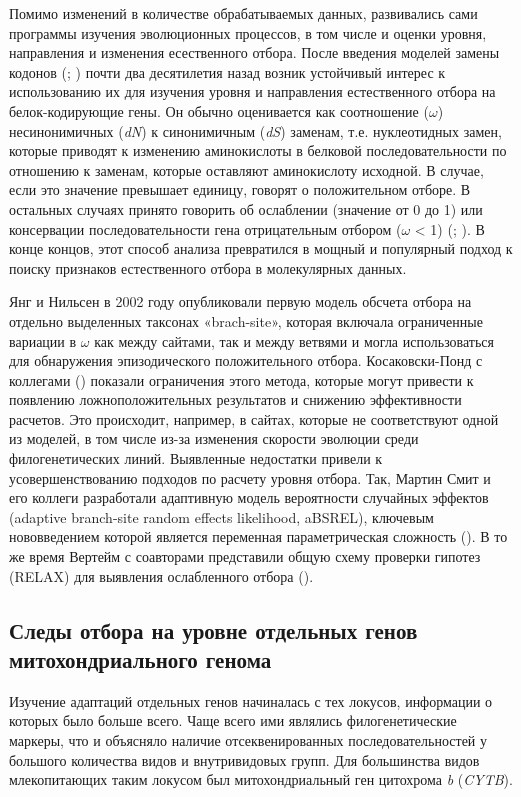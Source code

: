 Помимо изменений в количестве обрабатываемых данных, развивались сами программы изучения эволюционных процессов, в том числе и оценки уровня, направления и изменения есественного отбора. После введения моделей замены кодонов (\cite{Goldman1994}; \cite{Muse1994}) почти два десятилетия назад возник устойчивый интерес к использованию их для изучения уровня и направления естественного отбора на белок-кодирующие гены. Он обычно оценивается как соотношение ($\omega$) несинонимичных (\textit{dN}) к синонимичным (\textit{dS}) заменам, т.е. нуклеотидных замен, которые приводят к изменению аминокислоты в белковой последовательности по отношению к заменам, которые оставляют аминокислоту исходной. В случае, если это значение превышает единицу, говорят о положительном отборе. В остальных случаях принято говорить об ослаблении (значение от 0 до 1) или консервации последовательности гена отрицательным отбором ($\omega$ < 1) (\cite{Anisimova2009}; \cite{Delport2008}). В конце концов, этот способ анализа  превратился в мощный и популярный подход к поиску признаков естественного отбора в молекулярных данных. 

Янг и Нильсен в 2002 году опубликовали первую модель обсчета отбора на отдельно выделенных таксонах «brach-site», которая включала ограниченные вариации в $\omega$ как между сайтами, так и между ветвями и могла использоваться для обнаружения эпизодического положительного отбора. Косаковски-Понд с коллегами (\cite{KosakovskyPond2011}) показали ограничения этого метода, которые могут привести к появлению ложноположительных результатов и снижению эффективности расчетов. Это происходит, например, в сайтах, которые не соответствуют одной из моделей, в том числе из-за изменения скорости эволюции среди филогенетических линий. Выявленные недостатки привели к усовершенствованию подходов по расчету уровня отбора. Так, Мартин Смит и его коллеги разработали адаптивную модель вероятности случайных эффектов (adaptive branch-site random effects likelihood, aBSREL), ключевым нововведением которой является переменная параметрическая сложность (\cite{Smith2015}). В то же время Вертейм с соавторами представили общую схему проверки гипотез (RELAX) для выявления ослабленного отбора (\cite{Wertheim2015}). 

\subsection{Следы отбора на уровне отдельных генов митохондриального генома}

Изучение адаптаций отдельных генов начиналась с тех локусов, информации о которых было больше всего. Чаще всего ими являлись филогенетические маркеры, что и объясняло наличие отсеквенированных последовательностей у большого количества видов и внутривидовых групп.  Для большинства видов млекопитающих таким локусом был митохондриальный ген цитохрома \textit{b} (\textit{CYTB}).

